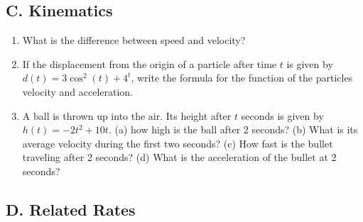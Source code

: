 \documentclass{article}
\begin{document}
\subsection*{C. Kinematics}
\begin{enumerate}
\item What is the difference between speed and velocity?
\item If the displacement from the origin of a particle after time $t$ is given by $d(t)=3\cos^2(t) + 4^t$, write the formula for the function of the particles velocity and acceleration.
\item A ball is thrown up into the air. Its height after $t$ seconds is given by $h(t)=-2t^2+10t$. (a) how high is the ball after 2 seconds? (b) What is its average velocity during the first two seconds? (c) How fast is the bullet traveling after 2 seconds? (d) What is the acceleration of the bullet at 2 seconds?
\end{enumerate}

\subsection*{D. Related Rates}
\end{document}
